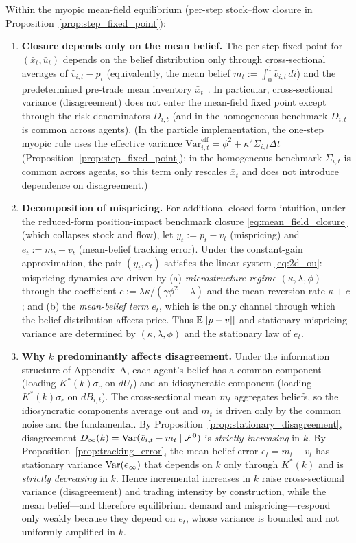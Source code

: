 \begin{proposition}
\label{prop:mechanism_k}
Within the myopic mean-field equilibrium (per-step stock--flow closure in Proposition~\ref{prop:step_fixed_point}):
\begin{enumerate}[label=(\roman*)]
\item \textbf{Closure depends only on the mean belief.}
The per-step fixed point for $(\bar x_t,\bar u_t)$ depends on the belief distribution only through cross-sectional averages of $\hat v_{i,t}-p_t$ (equivalently, the mean belief $m_t:=\int_0^1 \hat v_{i,t}\,di$) and the predetermined pre-trade mean inventory $\bar x_{t^-}$. In particular, cross-sectional variance (disagreement) does not enter the mean-field fixed point except through the risk denominators $D_{i,t}$ (and in the homogeneous benchmark $D_{i,t}$ is common across agents).
(In the particle implementation, the one-step myopic rule uses the effective variance
$\mathrm{Var}^{\mathrm{eff}}_{i,t}=\phi^2+\kappa^2\Sigma_{i,t}\Delta t$ (Proposition~\ref{prop:step_fixed_point}); in the homogeneous benchmark $\Sigma_{i,t}$ is common across agents, so this term only rescales $\bar x_t$ and does not introduce dependence on disagreement.)
\item \textbf{Decomposition of mispricing.}
For additional closed-form intuition, under the reduced-form position-impact benchmark closure \eqref{eq:mean_field_closure} (which collapses stock and flow), let $y_t := p_t - v_t$ (mispricing) and $e_t := m_t - v_t$ (mean-belief tracking error). Under the constant-gain approximation, the pair $(y_t,e_t)$ satisfies the linear system \eqref{eq:2d_ou}: mispricing dynamics are driven by (a) \emph{microstructure regime} $(\kappa,\lambda,\phi)$ through the coefficient $c := \lambda\kappa/(\gamma\phi^2-\lambda)$ and the mean-reversion rate $\kappa+c$; and (b) the \emph{mean-belief term} $e_t$, which is the only channel through which the belief distribution affects price. Thus $\mathbb{E}[|p-v|]$ and stationary mispricing variance are determined by $(\kappa,\lambda,\phi)$ and the stationary law of $e_t$.
\item \textbf{Why $k$ predominantly affects disagreement.}
Under the information structure of Appendix~A, each agent's belief has a common component (loading $K^*(k)\sigma_c$ on $dU_t$) and an idiosyncratic component (loading $K^*(k)\sigma_\epsilon$ on $dB_{i,t}$). The cross-sectional mean $m_t$ aggregates beliefs, so the idiosyncratic components average out and $m_t$ is driven only by the common noise and the fundamental. By Proposition~\ref{prop:stationary_disagreement}, disagreement $D_\infty(k)=\text{Var}(\hat v_{i,t}-m_t\mid \mathcal F^0)$ is \emph{strictly increasing} in $k$. By Proposition~\ref{prop:tracking_error}, the mean-belief error $e_t=m_t-v_t$ has stationary variance $\text{Var}(e_\infty)$ that depends on $k$ only through $K^*(k)$ and is \emph{strictly decreasing} in $k$. Hence incremental increases in $k$ raise cross-sectional variance (disagreement) and trading intensity by construction, while the mean belief---and therefore equilibrium demand and mispricing---respond only weakly because they depend on $e_t$, whose variance is bounded and not uniformly amplified in $k$.

\end{enumerate}
\end{proposition}
